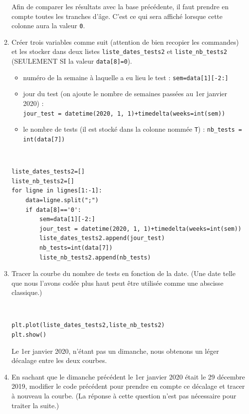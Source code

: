 \begin{enumerate}
Afin de comparer les résultats avec la base précédente, il faut prendre en compte toutes les tranches d'âge. C'est ce qui sera affiché lorsque cette colonne aura la valeur \verb?0?.

\setcounter{enumi}{8}
\item Créer trois variables comme suit (attention de bien recopier les commandes) et les stocker dans deux listes \verb?liste_dates_tests2? et \verb?liste_nb_tests2? (SEULEMENT SI la valeur \verb?data[8]=0?).

\begin{itemize}
 \item numéro de la semaine à laquelle a eu lieu le test : \verb?sem=data[1][-2:]?
 \item jour du test (on ajoute le nombre de semaines passées au 1er janvier 2020) :\\ \verb?jour_test = datetime(2020, 1, 1)+timedelta(weeks=int(sem))?
 \item le nombre de tests (il est stocké dans la colonne nommée \verb?T?) : \verb?nb_tests = int(data[7])?
\end{itemize}

\begin{solution}~\ \\
\begin{verbatim}
liste_dates_tests2=[]
liste_nb_tests2=[]
for ligne in lignes[1:-1]:
    data=ligne.split(";")
    if data[8]=='0':
        sem=data[1][-2:]
        jour_test = datetime(2020, 1, 1)+timedelta(weeks=int(sem))
        liste_dates_tests2.append(jour_test)
        nb_tests=int(data[7])
        liste_nb_tests2.append(nb_tests)
\end{verbatim}
\end{solution}

\item Tracer la courbe du nombre de tests en fonction de la date. (Une date telle que nous l'avons codée plus haut peut être utilisée comme une abscisse classique.)

\begin{solution}~\ \\
\begin{verbatim}
plt.plot(liste_dates_tests2,liste_nb_tests2)
plt.show()
\end{verbatim}
\end{solution}

Le 1er janvier 2020, n'étant pas un dimanche, nous obtenons un léger décalage entre les deux courbes.

\item En sachant que le dimanche précédent le 1er janvier 2020 était le 29 décembre 2019, modifier le code précédent pour prendre en compte ce décalage et tracer à nouveau la courbe. (La réponse à cette question n'est pas nécessaire pour traiter la suite.)


\end{enumerate}
